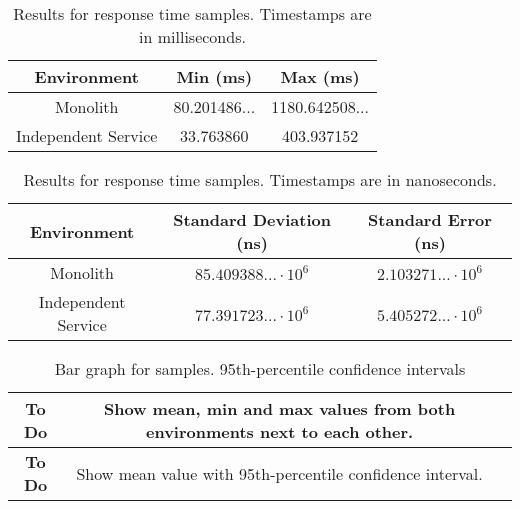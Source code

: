 \begin{table}[h!]
    \begin{tabular}{|c|c|c|} 
        \hline
        Environment
        & Min (ms)
        & Max (ms) \\ [0.5ex] 
        
        \hline\hline
        Monolith
        & 80.201486... 
        & 1180.642508...
        \\ 
        
        Independent Service
        & 33.763860
        & 403.937152
        \\
        \hline
    \end{tabular}
    \caption{Results for response time samples. Timestamps are in milliseconds.}
    \label{table:response time results:2}
\end{table}

\begin{table}[h!]
    \begin{tabular}{|c|c|c|} 
        \hline
        Environment
        & Standard Deviation (ns)
        & Standard Error (ns) \\ [0.5ex] 
        
        \hline\hline
        Monolith
        & $85.409388... \cdot 10^6$
        & $2.103271... \cdot 10^6$
        \\ 
        
        Independent Service
        & $77.391723... \cdot 10^6$
        & $5.405272... \cdot 10^6$
        \\ 
         \hline
    \end{tabular}
    \caption{Results for response time samples. Timestamps are in nanoseconds.}
    \label{table:response time results:3}
\end{table}

\begin{table}[h!]
    \begin{tabular}{|c|c|c|} 
        \hline
        \textbf{To Do}
        & Show mean, min and max values from both environments next to each other.
        \\
        \hline
        \textbf{To Do}
        & Show mean value with 95th-percentile confidence interval.
        \\ [0.5ex] 
        \hline
    \end{tabular}
    \caption{Bar graph for samples. 95th-percentile confidence intervals}
    \label{grap:response time results:bar-95th}
\end{table}

